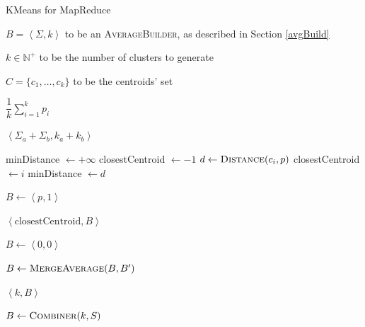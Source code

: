 \documentclass[parskip=full]{report}
\begin{document}
\begin{algorithm}
	\caption{KMeans for MapReduce}\label{algo:kmeans-reducer}
	\begin{algorithmic}[1]
		\Require $B = \left\langle \Sigma, k\right\rangle$ to be an 
		\textsc{AverageBuilder}, as described in Section \ref{avgBuild}
		
		\Require $k \in \mathbb{N}^+$ to be the number of clusters to generate
		
		\Require $C = \{c_1, \dots, c_k\}$ to be the centroids' set
		
		 
			\State \Return $\dfrac{1}{k}\sum_{i = 1}^{k} p_i$
		\EndProcedure
		
		\vspace{.25cm}
		
		 
			\State \Return $\left\langle \Sigma_a + \Sigma_b, k_a + k_b\right\rangle$
		\EndProcedure
		
		\vspace{.25cm}
		
			\State minDistance $\gets +\infty$
			\State closestCentroid $\gets -1$
				\State $d \gets \Call{Distance}{c_i, p}$
					\State closestCentroid $\gets i$
					\State minDistance $\gets d$
				\EndIf
			\EndFor
			
			\State $B \gets \left\langle p, 1\right\rangle$ 
			
			\State \Return $\left\langle \text{closestCentroid}, B\right\rangle$
				
		\EndProcedure
		
		\vspace{.25cm}
		
		\State $B \gets \left\langle 0,0 \right\rangle$
		
			\State $B \gets \Call{MergeAverage}{B, B'}$
		\EndFor

		\State \Return $\left\langle k, B\right\rangle$
		\EndProcedure
		
		\vspace{.25cm}
		
		\State $B \gets \Call{Combiner}{k,S}$
		\State \Return {}
		\EndProcedure
	\end{algorithmic}
\end{algorithm}
\end{document}
